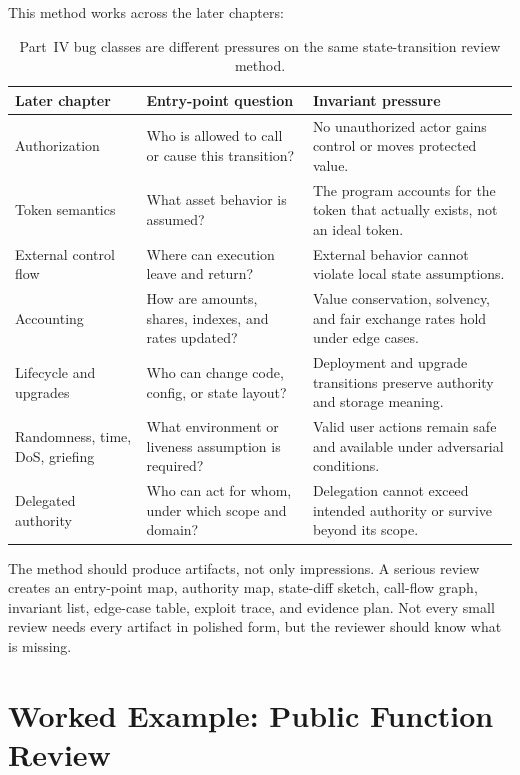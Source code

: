 This method works across the later chapters:

\begin{table}[htbp]
\centering
\small
\renewcommand{\arraystretch}{1.18}
\begin{tabularx}{\textwidth}{@{}>{\RaggedRight\arraybackslash}p{}>{\RaggedRight\arraybackslash}p{}X@{}}
\toprule
Later chapter & Entry-point question & Invariant pressure \\
\midrule
Authorization & Who is allowed to call or cause this transition? & No unauthorized actor gains control or moves protected value. \\
Token semantics & What asset behavior is assumed? & The program accounts for the token that actually exists, not an ideal token. \\
External control flow & Where can execution leave and return? & External behavior cannot violate local state assumptions. \\
Accounting & How are amounts, shares, indexes, and rates updated? & Value conservation, solvency, and fair exchange rates hold under edge cases. \\
Lifecycle and upgrades & Who can change code, config, or state layout? & Deployment and upgrade transitions preserve authority and storage meaning. \\
Randomness, time, DoS, griefing & What environment or liveness assumption is required? & Valid user actions remain safe and available under adversarial conditions. \\
Delegated authority & Who can act for whom, under which scope and domain? & Delegation cannot exceed intended authority or survive beyond its scope. \\
\bottomrule
\end{tabularx}
\caption{Part~IV bug classes are different pressures on the same state-transition review method.}
\end{table}

The method should produce artifacts, not only impressions. A serious review creates an entry-point map, authority map, state-diff sketch, call-flow graph, invariant list, edge-case table, exploit trace, and evidence plan. Not every small review needs every artifact in polished form, but the reviewer should know what is missing.

\section{Worked Example: Public Function Review}

